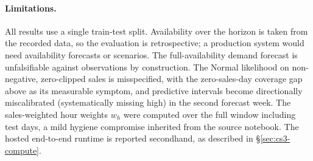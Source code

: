 \paragraph{Limitations.}
All results use a single train-test split. Availability over the horizon is taken from the recorded data, so the evaluation is retrospective; a production system would need availability forecasts or scenarios. The full-availability demand forecast is unfalsifiable against observations by construction. The Normal likelihood on non-negative, zero-clipped sales is misspecified, with the zero-sales-day coverage gap above as its measurable symptom, and predictive intervals become directionally miscalibrated (systematically missing high) in the second forecast week. The sales-weighted hour weights $w_h$ were computed over the full window including test days, a mild hygiene compromise inherited from the source notebook. The hosted end-to-end runtime is reported secondhand, as described in \S\ref{sec:cs3-compute}.
